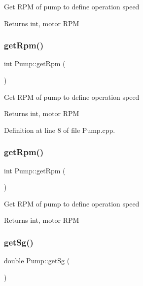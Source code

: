 Get R\+PM of pump to define operation speed

\begin{DoxyReturn}{Returns}
int, motor R\+PM 
\end{DoxyReturn}
\mbox{\label{class_pump_a66870deae37979d64a910b89c6977b26}} 
\subsubsection{\texorpdfstring{get\+Rpm()}{getRpm()}\hspace{0.1cm}{\footnotesize\ttfamily [2/3]}}
{\footnotesize\ttfamily int Pump\+::get\+Rpm (\begin{DoxyParamCaption}{ }\end{DoxyParamCaption})}

Get R\+PM of pump to define operation speed

\begin{DoxyReturn}{Returns}
int, motor R\+PM 
\end{DoxyReturn}


Definition at line 8 of file Pump.\+cpp.

\mbox{\label{class_pump_a66870deae37979d64a910b89c6977b26}} 
\subsubsection{\texorpdfstring{get\+Rpm()}{getRpm()}\hspace{0.1cm}{\footnotesize\ttfamily [3/3]}}
{\footnotesize\ttfamily int Pump\+::get\+Rpm (\begin{DoxyParamCaption}{ }\end{DoxyParamCaption})}

Get R\+PM of pump to define operation speed

\begin{DoxyReturn}{Returns}
int, motor R\+PM 
\end{DoxyReturn}
\mbox{\label{class_pump_ae30109b8533176cc1c7c80cf9df95631}} 
\subsubsection{\texorpdfstring{get\+Sg()}{getSg()}\hspace{0.1cm}{\footnotesize\ttfamily [1/3]}}
{\footnotesize\ttfamily double Pump\+::get\+Sg (\begin{DoxyParamCaption}{ }\end{DoxyParamCaption})\hspace{0.3cm}{\ttfamily [inline]}}

